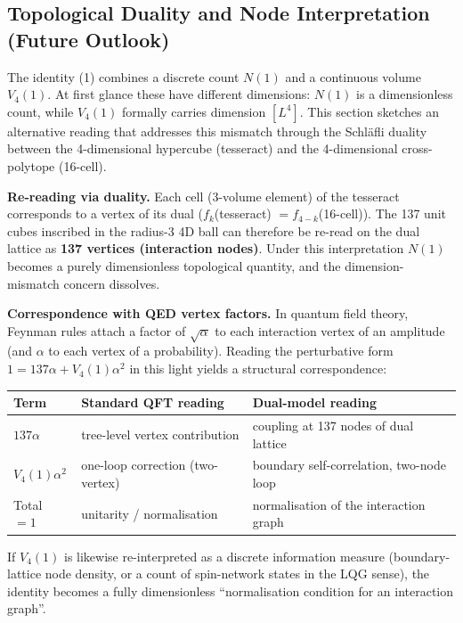\documentclass[a4paper,11pt]{article}
\begin{document}
\subsection{Topological Duality and Node Interpretation (Future Outlook)}

The identity (1) combines a discrete count $N(1)$ and a continuous volume $V_4(1)$. At first glance these have different dimensions: $N(1)$ is a dimensionless count, while $V_4(1)$ formally carries dimension $[L^4]$. This section sketches an alternative reading that addresses this mismatch through the Schl\"afli duality between the 4-dimensional hypercube (tesseract) and the 4-dimensional cross-polytope (16-cell).

\textbf{Re-reading via duality.} Each cell (3-volume element) of the tesseract corresponds to a vertex of its dual ($f_k$(tesseract) $= f_{4-k}$(16-cell)). The 137 unit cubes inscribed in the radius-3 4D ball can therefore be re-read on the dual lattice as \textbf{137 vertices (interaction nodes)}. Under this interpretation $N(1)$ becomes a purely dimensionless topological quantity, and the dimension-mismatch concern dissolves.

\textbf{Correspondence with QED vertex factors.} In quantum field theory, Feynman rules attach a factor of $\sqrt{\alpha}$ to each interaction vertex of an amplitude (and $\alpha$ to each vertex of a probability). Reading the perturbative form $1 = 137\alpha + V_4(1)\alpha^2$ in this light yields a structural correspondence:

\begin{center}
\begin{tabular}{lll}
\toprule
Term & Standard QFT reading & Dual-model reading \\
\midrule
$137\alpha$ & tree-level vertex contribution & coupling at 137 nodes of dual lattice \\
$V_4(1)\alpha^2$ & one-loop correction (two-vertex) & boundary self-correlation, two-node loop \\
Total $= 1$ & unitarity / normalisation & normalisation of the interaction graph \\
\bottomrule
\end{tabular}
\end{center}

If $V_4(1)$ is likewise re-interpreted as a discrete information measure (boundary-lattice node density, or a count of spin-network states in the LQG sense), the identity becomes a fully dimensionless ``normalisation condition for an interaction graph''.
\end{document}
